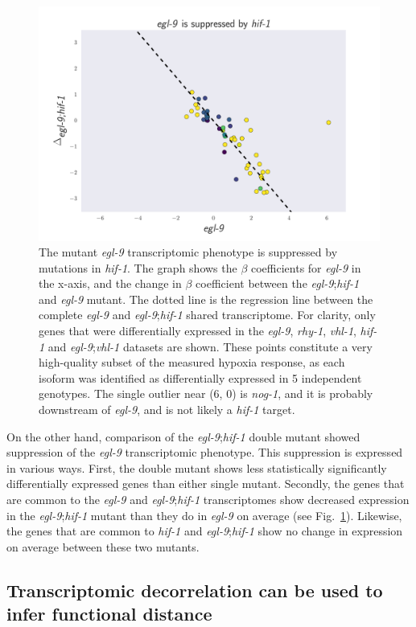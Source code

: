 \documentclass[9pt,twocolumn,twoside]{pnas-new}
\newcommand{\egl}{\emph{egl-9}}
\newcommand{\nog}{\emph{nog-1}}
\newcommand{\rhy}{\emph{rhy-1}}
\newcommand{\vhl}{\emph{vhl-1}}
\newcommand{\hif}{\emph{hif-1}}
\begin{document}
\begin{figure}[tbhp]
\centering
\includegraphics[width=\linewidth]{figs/egl9_epistatic_eglhif.pdf}
\caption{
The mutant \egl{} transcriptomic phenotype is suppressed by mutations in \hif{}. The graph shows the $\beta$ coefficients for \egl{} in the x-axis, and the change in $\beta$ coefficient between the \egl;\hif{} and \egl{} mutant. The dotted line is the regression line between the complete \egl{} and \egl{};\hif{} shared transcriptome. For clarity, only genes that were differentially expressed in the \egl{}, \rhy{}, \vhl{}, \hif{} and \egl;\vhl{} datasets are shown. These points constitute a very high-quality subset of the measured hypoxia response, as each isoform was identified as differentially expressed in 5 independent genotypes.
The single outlier near (6, 0) is \nog{}, and it is probably downstream of \egl{}, and is not likely a \hif{} target.
}
\label{fig:egl9epistasis}
\end{figure}

On the other hand, comparison of the \egl{};\hif{} double mutant showed suppression of the \egl{} transcriptomic phenotype. This suppression is expressed in various ways. First, the double mutant shows less statistically significantly differentially expressed genes than either single mutant. Secondly, the genes that are common to the \egl{} and \egl{};\hif{} transcriptomes show decreased expression in the \egl{};\hif{} mutant than they do in \egl{} on average (see Fig.~\ref{fig:egl9epistasis}). Likewise, the genes that are common to \hif{} and \egl{};\hif{} show no change in expression on average between these two mutants.

\subsection{Transcriptomic decorrelation can be used to infer functional distance}
\label{sub:decorrelation}
\end{document}
